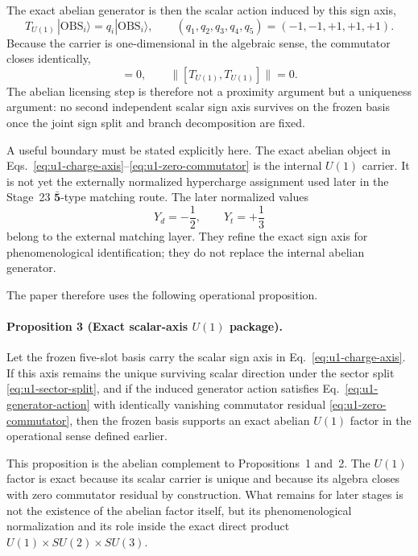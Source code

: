 \documentclass[11pt]{article}
\begin{document}
The exact abelian generator is then the scalar action induced by this sign axis,
\begin{equation}
T_{U(1)}\,|\mathrm{OBS}_i\rangle = q_i|\mathrm{OBS}_i\rangle,
\qquad
(q_1,q_2,q_3,q_4,q_5)=(-1,-1,+1,+1,+1).
\label{eq:u1-generator-action}
\end{equation}
Because the carrier is one-dimensional in the algebraic sense, the commutator closes identically,
\begin{equation}
[T_{U(1)},T_{U(1)}]=0,
\qquad
\|[T_{U(1)},T_{U(1)}]\|=0.
\label{eq:u1-zero-commutator}
\end{equation}
The abelian licensing step is therefore not a proximity argument but a uniqueness argument: no second independent scalar sign axis survives on the frozen basis once the joint sign split and branch decomposition are fixed.

A useful boundary must be stated explicitly here. The exact abelian object in Eqs.~\eqref{eq:u1-charge-axis}--\eqref{eq:u1-zero-commutator} is the internal $U(1)$ carrier. It is not yet the externally normalized hypercharge assignment used later in the Stage~23 $\bar{\mathbf 5}$-type matching route. The later normalized values
\begin{equation}
Y_d=-\frac{1}{2},\qquad Y_t=+\frac{1}{3}
\label{eq:u1-later-hypercharge-boundary}
\end{equation}
belong to the external matching layer. They refine the exact sign axis for phenomenological identification; they do not replace the internal abelian generator.

The paper therefore uses the following operational proposition.

\paragraph{Proposition 3 (Exact scalar-axis $U(1)$ package).}
Let the frozen five-slot basis carry the scalar sign axis in Eq.~\eqref{eq:u1-charge-axis}. If this axis remains the unique surviving scalar direction under the sector split \eqref{eq:u1-sector-split}, and if the induced generator action satisfies Eq.~\eqref{eq:u1-generator-action} with identically vanishing commutator residual \eqref{eq:u1-zero-commutator}, then the frozen basis supports an exact abelian $U(1)$ factor in the operational sense defined earlier.

This proposition is the abelian complement to Propositions~1 and~2. The $U(1)$ factor is exact because its scalar carrier is unique and because its algebra closes with zero commutator residual by construction. What remains for later stages is not the existence of the abelian factor itself, but its phenomenological normalization and its role inside the exact direct product $U(1)\times SU(2)\times SU(3)$.
\end{document}
